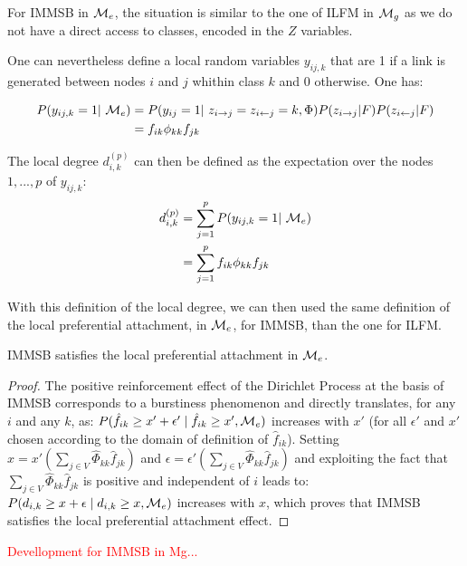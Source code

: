 For IMMSB in $\mathcal{M}_e$, the situation is similar to the one of ILFM in $\mathcal{M}_g$ as we do not have a direct access to classes, encoded in the $Z$ variables.

One can nevertheless define a local random variables $y_{ij,k}$ that are 1 if a link is generated between nodes $i$ and $j$ whithin class $k$ and 0 otherwise. One has:

\begin{align*}
P(y_{ij,k}=1 | \M_e) &= P(y_{ij}=1 | z_{i\rightarrow j} = z_{i\leftarrow j}=k, \Phi) P(z_{i\rightarrow j}|F)P(z_{i\leftarrow j}|F) \\
    &= f_{ik} \phi_{kk} f_{jk}
\end{align*}

The local degree $d_{i,k}^{(p)}$ can then be defined as the expectation over the nodes $1,...,p$ of $y_{ij,k}$:
\begin{align*}
d_{i,k}^{(p)} &= \sum_{j=1}^p P(y_{ij,k}=1 | \M_e)  \\
    &= \sum_{j=1}^p f_{ik} \phi_{kk} f_{jk}
\end{align*}

With this definition of the local degree, we can then used the same definition of the local preferential attachment, in $\mathcal{M}_e$, for IMMSB, than the one for ILFM. 

\begin{proposition}
IMMSB satisfies the local preferential attachment in $\mathcal{M}_e$.
\end{proposition}

\begin{proof}
The positive reinforcement effect of the Dirichlet Process \cite{HDP} at the basis of IMMSB corresponds to a burstiness phenomenon and directly translates, for any $i$ and any $k$, as: $P(\hat{f}_{ik} \ge x'+\epsilon' \mid \hat{f}_{ik} \ge x',\mathcal{M}_e)$ increases with $x'$ (for all $\epsilon'$ and $x'$ chosen according to the domain of definition of $\hat{f}_{ik}$). Setting $x=x'(\sum_{j\in V} \hat{\Phi}_{kk} \hat{f}_{jk})$ and $\epsilon = \epsilon'(\sum_{j\in V} \hat{\Phi}_{kk} \hat{f}_{jk})$ and exploiting the fact that $\sum_{j\in V} \hat{\Phi}_{kk} \hat{f}_{jk}$ is positive and independent of $i$ leads to: $P(d_{i,k} \ge x+\epsilon \mid d_{i,k} \ge x, \mathcal{M}_e)$ increases with $x$, which proves that IMMSB satisfies the local preferential attachment effect.

\end{proof}


\textcolor{red}{Devellopment for IMMSB in Mg...}

